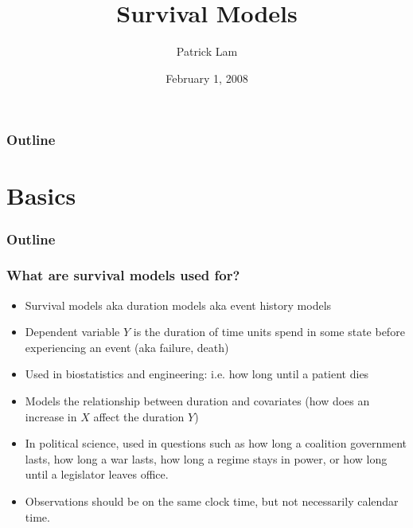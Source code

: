 \documentclass{beamer}
\author{Patrick Lam}
\title{Survival Models}
\date{February 1, 2008}
\begin{document}
\frame{\titlepage}

\begin{frame}
\frametitle{Outline}
\tableofcontents
\end{frame}

\section{Basics}

\begin{frame}
\frametitle{Outline}
\tableofcontents[currentsection]
\end{frame}

\begin{frame}
\frametitle{What are survival models used for?}
\begin{itemize}
\item Survival models aka duration models aka event history models
\pause
\item Dependent variable $Y$ is the duration of time units spend in some
state before experiencing an event (aka failure, death)
\pause
\item Used in biostatistics and engineering: i.e. how long until a patient
dies
\pause
\item Models the relationship between duration and covariates (how
does an increase in $X$ affect the duration $Y$)
\pause
\item In political science, used in questions such as how long a
coalition government lasts, how long a war lasts, how long a regime
stays in power, or how long until a legislator leaves office.
\pause
\item Observations should be on the same clock time, but not
necessarily calendar time.
\end{itemize}
\end{frame}
\end{document}
